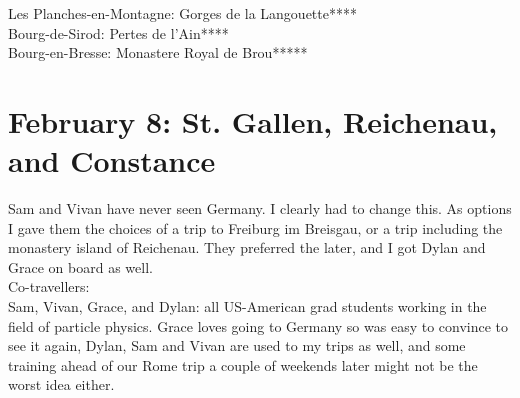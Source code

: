 Les Planches-en-Montagne: Gorges de la Langouette****\\
Bourg-de-Sirod: Pertes de l'Ain****\\
Bourg-en-Bresse: Monastere Royal de Brou*****\\

\section{February 8: St. Gallen, Reichenau, and Constance}
\label{2020:Reichenau}

Sam and Vivan have never seen Germany. I clearly had to change this. As options I gave them the choices of a trip to Freiburg im Breisgau, or a trip including the monastery island of Reichenau. They preferred the later, and I got Dylan and Grace on board as well.\\

Co-travellers:\\
Sam, Vivan, Grace, and Dylan: all US-American grad students working in the field of particle physics. Grace loves going to Germany so was easy to convince to see it again, Dylan, Sam and Vivan are used to my trips as well, and some training ahead of our Rome trip a couple of weekends later might not be the worst idea either.\\

